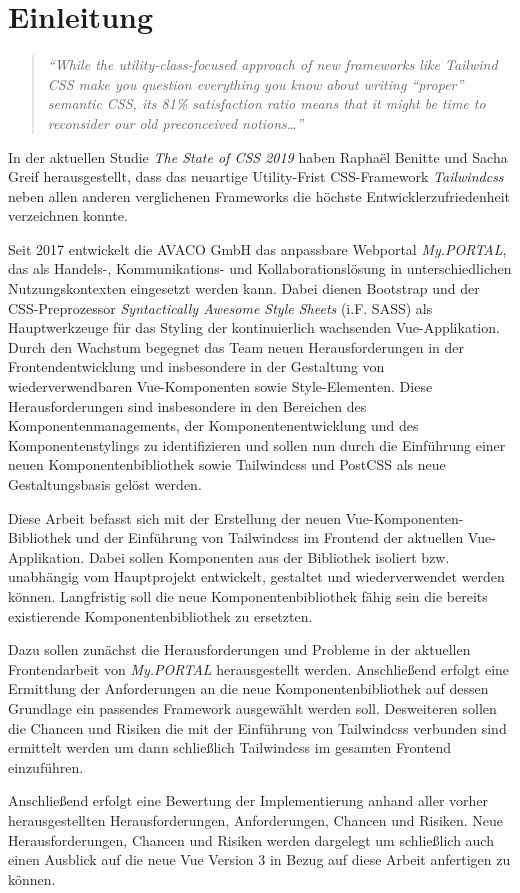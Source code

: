 \chapter{Einleitung}
\label{cha:Einleitung}

\begin{quotation}
	\emph{``While the utility-class-focused approach of new frameworks like Tailwind CSS make you question everything you know about writing “proper” semantic CSS, its 81\% satisfaction ratio means that it might be time to reconsider our old preconceived notions…''}
	\citep{StateCSS2019_Frameworks}
\end{quotation}

In der aktuellen Studie \textit{The State of CSS 2019} haben Raphaël Benitte und Sacha Greif herausgestellt, dass das neuartige Utility-Frist CSS-Framework \textit{Tailwindcss} neben allen anderen verglichenen Frameworks die höchste Entwicklerzufriedenheit verzeichnen konnte.

Seit 2017 entwickelt die AVACO GmbH das anpassbare Webportal \textit{My.PORTAL}, das als Handels-, Kommunikations- und Kollaborationslösung in unterschiedlichen Nutzungskontexten eingesetzt werden kann. Dabei dienen Bootstrap und der CSS-Preprozessor \textit{Syntactically Awesome Style Sheets} (i.F. SASS) als Hauptwerkzeuge für das Styling der kontinuierlich wachsenden Vue-Applikation. Durch den Wachstum begegnet das Team neuen Herausforderungen in der Frontendentwicklung und insbesondere in der Gestaltung von wiederverwendbaren Vue-Komponenten sowie Style-Elementen. Diese Herausforderungen sind insbesondere in den Bereichen des Komponentenmanagements, der Komponentenentwicklung und des Komponentenstylings zu identifizieren und sollen nun durch die Einführung einer neuen Komponentenbibliothek sowie Tailwindcss und PostCSS als neue Gestaltungsbasis gelöst werden.

Diese Arbeit befasst sich mit der Erstellung der neuen Vue-Komponenten-Bibliothek und der Einführung von Tailwindcss im Frontend der aktuellen Vue-Applikation.
Dabei sollen Komponenten aus der Bibliothek isoliert bzw. unabhängig vom Hauptprojekt entwickelt, gestaltet und wiederverwendet werden können. Langfristig soll die neue Komponentenbibliothek fähig sein die bereits existierende Komponentenbibliothek zu ersetzten.

Dazu sollen zunächst die Herausforderungen und Probleme in der aktuellen Frontendarbeit von \textit{My.PORTAL} herausgestellt werden. Anschließend erfolgt eine Ermittlung der Anforderungen an die neue Komponentenbibliothek auf dessen Grundlage ein passendes Framework ausgewählt werden soll. Desweiteren sollen die Chancen und Risiken die mit der Einführung von Tailwindcss verbunden sind ermittelt werden um dann schließlich Tailwindcss im gesamten Frontend einzuführen.

Anschließend erfolgt eine Bewertung der Implementierung anhand aller vorher herausgestellten Herausforderungen, Anforderungen, Chancen und Risiken. Neue Herausforderungen, Chancen und Risiken werden dargelegt um schließlich auch einen Ausblick auf die neue Vue Version 3 in Bezug auf diese Arbeit anfertigen zu können.